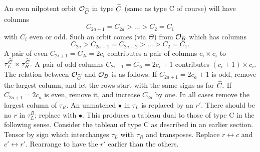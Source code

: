 \documentclass[11pt ,reqno]{amsart}
\begin{document}
\bigskip
An even nilpotent orbit $\mathcal O_{{\widetilde C}}$ in type
${\widetilde C}$ (same as type C of course) will have columns
$$
C_{2a+1}=C_{2a}>\dots >C_2=C_1
$$
with $C_i$ even or odd. Such an orbit comes (via $\Theta$) from
$\mathcal O_B$ which has columns
$$
C_{2a}>C_{2a-1}=C_{2a-2}>\dots >C_2=C_1.
$$
A pair of even $C_{2i+1}=C_{2i}=2c_i$ contributes a pair of 
columns  $c_i\times c_i$ to $\tau_L^{{\widetilde C}}\times\tau_R^{{\widetilde C}}.$ A pair of odd
columns $C_{2i+1}=C_{2i}=2c_i+1$ contributes $(c_{i}+1)\times
c_{i}$. 
The relation between $\mathcal O_{{\widetilde C}}$ and $\mathcal O_{B}$ is as follows. If
$C_{2a+1}=2c_a+1$ is odd, remove the largest column, and let the rows
start with the same signs as for ${\widetilde C}.$ If $C_{2a+1}=2c_a$ is even,
remove it, and increase $C_{2a}$ by one. In all cases remove the
largest column of $\tau_R.$ An unmatched $\bullet$ in $\tau_L$ is
replaced by an $r'$. There should be no $r$ in $\tau_L^B$; replace
with $\bullet.$ This produces a tableau dual to those of type
C in the following sense. Consider the tableau of type C as described
in an earlier section. Tensor by sign which interchanges $\tau_L$
with $\tau_R$ and transposes. Replace $r\longleftrightarrow c$
and $c'\leftrightarrow r'.$ Rearrange to have the $r'$ earlier than  the
others.
\end{document}
